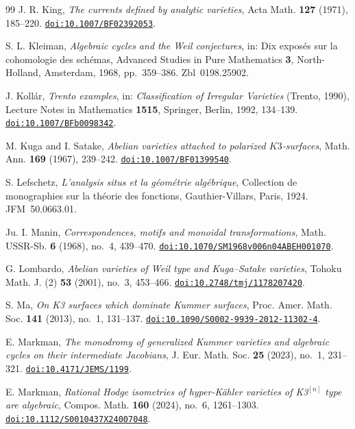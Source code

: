 \begin{thebibliography}{99}
J. R. King,
\emph{The currents defined by analytic varieties},
Acta Math. \textbf{127} (1971), 185--220.
\href{https://doi.org/10.1007/BF02392053}{\nolinkurl{doi:10.1007/BF02392053}}.

S. L. Kleiman,
\emph{Algebraic cycles and the Weil conjectures},
in: Dix expos\'es sur la cohomologie des sch\'emas,
Advanced Studies in Pure Mathematics \textbf{3}, North-Holland, Amsterdam, 1968, pp.~359--386. Zbl~0198.25902.

J. Koll\'ar,
\emph{Trento examples},
in: \emph{Classification of Irregular Varieties} (Trento, 1990),
Lecture Notes in Mathematics \textbf{1515}, Springer, Berlin, 1992, 134--139.
\href{https://doi.org/10.1007/BFb0098342}{\nolinkurl{doi:10.1007/BFb0098342}}.

M. Kuga and I. Satake,
\emph{Abelian varieties attached to polarized $K3$-surfaces},
Math. Ann. \textbf{169} (1967), 239--242.
\href{https://doi.org/10.1007/BF01399540}{\nolinkurl{doi:10.1007/BF01399540}}.

S. Lefschetz,
\emph{L'analysis situs et la g\'eom\'etrie alg\'ebrique},
Collection de monographies sur la th\'eorie des fonctions, Gauthier-Villars, Paris, 1924. JFM~50.0663.01.

Ju. I. Manin,
\emph{Correspondences, motifs and monoidal transformations},
Math. USSR-Sb. \textbf{6} (1968), no.~4, 439--470.
\href{https://doi.org/10.1070/SM1968v006n04ABEH001070}{\nolinkurl{doi:10.1070/SM1968v006n04ABEH001070}}.

G. Lombardo,
\emph{Abelian varieties of Weil type and Kuga--Satake varieties},
Tohoku Math. J. (2) \textbf{53} (2001), no.~3, 453--466.
\href{https://doi.org/10.2748/tmj/1178207420}{\nolinkurl{doi:10.2748/tmj/1178207420}}.

S. Ma,
\emph{On K3 surfaces which dominate Kummer surfaces},
Proc. Amer. Math. Soc. \textbf{141} (2013), no.~1, 131--137.
\href{https://doi.org/10.1090/S0002-9939-2012-11302-4}{\nolinkurl{doi:10.1090/S0002-9939-2012-11302-4}}.

E. Markman,
\emph{The monodromy of generalized Kummer varieties and algebraic cycles on their intermediate Jacobians},
J. Eur. Math. Soc. \textbf{25} (2023), no.~1, 231--321.
\href{https://doi.org/10.4171/JEMS/1199}{\nolinkurl{doi:10.4171/JEMS/1199}}.

E. Markman,
\emph{Rational Hodge isometries of hyper-K\"ahler varieties of K3$^{[n]}$
type are algebraic},
Compos. Math. \textbf{160} (2024), no.~6, 1261--1303.
\href{https://doi.org/10.1112/S0010437X24007048}{\nolinkurl{doi:10.1112/S0010437X24007048}}.


\end{thebibliography}
